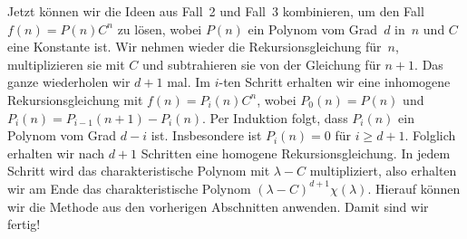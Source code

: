Jetzt können wir die Ideen aus Fall~2 und Fall~3 kombinieren, um den Fall $f(n)=P(n)C^n$ zu lösen, wobei $P(n)$ ein Polynom vom Grad~$d$ in~$n$ und $C$ eine Konstante ist. Wir nehmen wieder die Rekursionsgleichung für~$n$, multiplizieren sie mit $C$ und subtrahieren sie von der Gleichung für $n+1$. Das ganze wiederholen wir $d+1$ mal. Im $i$-ten Schritt erhalten wir eine inhomogene Rekursionsgleichung mit $f(n)=P_i(n)C^n$, wobei $P_0(n)=P(n)$ und $P_i(n)=P_{i-1}(n+1)-P_i(n)$. Per Induktion folgt, dass $P_i(n)$ ein Polynom vom Grad $d-i$ ist. Insbesondere ist $P_i(n)=0$ für $i\geqslant d+1$. Folglich erhalten wir nach $d+1$ Schritten eine homogene Rekursionsgleichung. In jedem Schritt wird das charakteristische Polynom mit $\lambda-C$ multipliziert, also erhalten wir am Ende das charakteristische Polynom $(\lambda-C)^{d+1}\chi(\lambda)$. Hierauf können wir die Methode aus den vorherigen Abschnitten anwenden. Damit sind wir fertig!